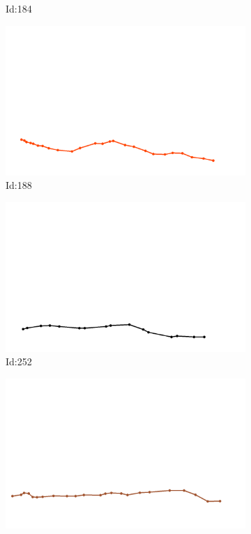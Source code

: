 \documentclass[12pt,twoside]{report}
\begin{document}
\begin{figure}
\begin{subfigure}[b]{0.20\textwidth}
\caption{Id:184}
\end{subfigure}
\begin{subfigure}[b]{0.20\textwidth}
\centering
\includegraphics[width=\textwidth]{../trajectories/188.png}
\caption{Id:188}
\end{subfigure}
\begin{subfigure}[b]{0.20\textwidth}
\centering
\includegraphics[width=\textwidth]{../trajectories/252.png}
\caption{Id:252}
\end{subfigure}
\begin{subfigure}[b]{0.20\textwidth}
\centering
\includegraphics[width=\textwidth]{../trajectories/282.png}

\end{subfigure}
\end{figure}
\end{document}
